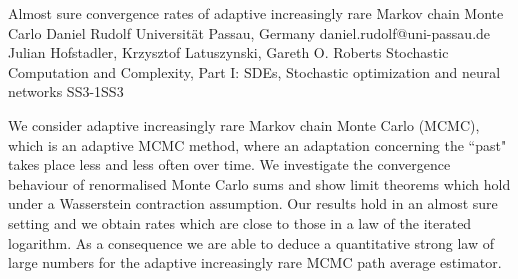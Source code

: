 \begin{talk}
  {Almost sure convergence rates of adaptive increasingly rare Markov chain Monte Carlo}%
  {Daniel Rudolf}%
  {Universit\"at Passau, Germany}%
  {daniel.rudolf@uni-passau.de}%
  {Julian Hofstadler, Krzysztof Latuszynski, Gareth O. Roberts}%
{Stochastic Computation and Complexity, Part I: SDEs, Stochastic optimization and neural networks}
{}{SS3-1}{SS3}

			

We consider adaptive increasingly rare Markov chain Monte Carlo (MCMC), which is an adaptive MCMC method, where an adaptation concerning the ``past" takes place less and less often over time. We investigate the convergence behaviour of renormalised Monte Carlo sums and show limit theorems which hold under a Wasserstein contraction assumption. Our results hold in an almost sure setting and we obtain rates which are close to those in a law of the iterated logarithm. As a consequence we are able to deduce a quantitative strong law of large numbers for the adaptive increasingly rare MCMC path average estimator.

\medskip

%
\end{talk}

